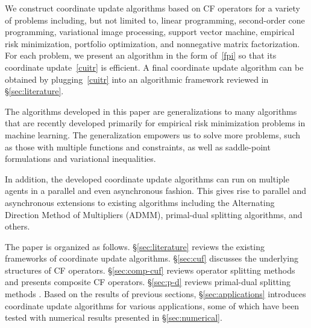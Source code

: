 We construct coordinate update algorithms based on CF operators for a variety of problems including, but not limited to, linear programming, second-order cone programming, variational image processing, support vector machine, empirical risk minimization, portfolio optimization, and nonnegative matrix factorization. For each problem, we present an algorithm in the form of~\eqref{fpi} so that its coordinate update~\eqref{cuitr} is efficient. A final coordinate update algorithm can be obtained by plugging~\eqref{cuitr} into an algorithmic framework reviewed in \S\ref{sec:literature}. 

The algorithms developed in this paper are generalizations to many algorithms that are recently developed primarily for empirical risk minimization problems in machine learning. %
The generalization empowers us to solve more problems, such as those with multiple functions and constraints, as well as saddle-point formulations and variational inequalities.


In addition, the developed coordinate update algorithms can run on multiple agents in a parallel and even asynchronous fashion. This gives rise to parallel and asynchronous extensions to  existing algorithms including the Alternating Direction Method of Multipliers (ADMM), primal-dual splitting algorithms, and others.

The paper is organized as follows. \S\ref{sec:literature} reviews the existing frameworks of coordinate update algorithms. \S\ref{sec:cuf} discusses the underlying structures of CF operators. \S\ref{sec:comp-cuf} reviews operator splitting methods and presents composite CF operators. \S\ref{sec:p-d} reviews primal-dual splitting methods . Based on the results of previous sections, \S\ref{sec:applications} introduces  coordinate update algorithms for various applications, some of which have been tested with numerical results presented in \S\ref{sec:numerical}.

